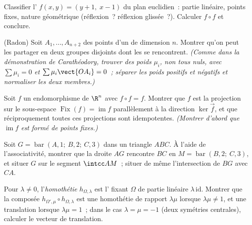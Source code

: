\begin{exercise}[$\star\star$]\label{exo:b2:affine:6}
Classifier l' $f(x, y) = (y + 1,\; x - 1)$ du
plan euclidien~: partie linéaire, points fixes, nature géométrique
(réflexion~? réflexion glissée~?). Calculer $f \circ f$ et conclure.
\end{exercise}

\begin{exercise}[$\star\star\star$]\label{exo:b2:affine:7}
(Radon) Soit $A_1, \dots, A_{n+2}$ des points d'un  de
dimension $n$. Montrer qu'on peut les partager en deux groupes
disjoints dont les  se rencontrent. \emph{(Comme
dans la démonstration de Carathéodory, trouver des poids $\mu_i$, non
tous nuls, avec $\sum\mu_i = 0$ et
$\sum\mu_i\vect{OA_i} = 0$~; séparer les poids positifs et négatifs et
normaliser les deux membres.)}
\end{exercise}

\begin{exercise}[$\star\star\star$]\label{exo:b2:affine:8}
Soit $f$ un endomorphisme  de $\R^n$ avec $f \circ f = f$.
Montrer que $f$ est la projection  sur le sous-espace 
$\operatorname{Fix}(f) = \operatorname{im} f$ parallèlement à la
direction $\ker\vec f$, et que réciproquement toutes ces projections
sont idempotentes. \emph{(Montrer d'abord que $\operatorname{im} f$ est
formé de points fixes.)}
\end{exercise}

\begin{exercise}[$\star$]\label{exo:b2:affine:9}
Soit $G = \operatorname{bar}(A, 1;\ B, 2;\ C, 3)$ dans un triangle
$ABC$. À l'aide de l'associativité, montrer que la droite $AG$ rencontre
$BC$ en $M = \operatorname{bar}(B, 2;\ C, 3)$, et situer $G$ sur le
segment $\intcc AM$~; situer de même l'intersection de $BG$
avec $CA$.
\end{exercise}

\begin{exercise}[$\star\star$]\label{exo:b2:affine:10}
Pour $\lambda \neq 0$, l'\emph{homothétie} $h_{\Omega,
\lambda}$ est l' fixant $\Omega$ de partie linéaire
$\lambda\,\mathrm{id}$. Montrer que la composée
$h_{\Omega', \mu} \circ h_{\Omega, \lambda}$ est une homothétie de
rapport $\lambda\mu$ lorsque $\lambda\mu \neq 1$, et une translation
lorsque $\lambda\mu = 1$~; dans le cas $\lambda = \mu = -1$ (deux
symétries centrales), calculer le vecteur de translation.
\end{exercise}

